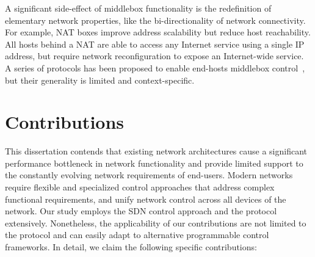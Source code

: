 A significant side-effect of middlebox functionality is the redefinition of
elementary network properties, like the bi-directionality of network
connectivity.  For example, NAT boxes improve address scalability but reduce
host reachability.  All hosts behind a NAT are able to access any Internet
service using a single IP address, but require network reconfiguration to expose
an Internet-wide service. A series of protocols has been proposed to 
enable end-hosts middlebox control~, but their generality is
limited and context-specific.




\section{Contributions}\label{sec:intro:contributions}

This dissertation contends that existing network architectures cause a
significant performance bottleneck in network functionality and provide limited
support to the constantly evolving network requirements of end-users.  Modern
networks require flexible and specialized control approaches that address
complex functional requirements, and unify network control across all devices
of the network. Our study employs the SDN control approach and the \of protocol
extensively.  Nonetheless, the applicability of our contributions are not
limited to the \of protocol and can easily adapt to alternative programmable
control frameworks. In detail, we claim the following specific contributions:

